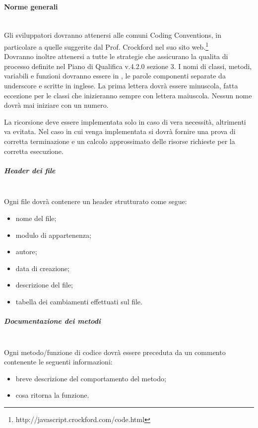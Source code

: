 \paragraph{Norme generali} \hfill \\
\label{}
Gli sviluppatori dovranno attenersi alle comuni Coding Conventions, in particolare a quelle suggerite dal Prof. Crockford nel suo sito web.\footnote{http://javascript.crockford.com/code.html}\\
Dovranno inoltre attenersi a tutte le strategie che assicurano la qualita di processo definite nel Piano di Qualifica v.4.2.0 sezione 3. 
I nomi di classi, metodi, variabili e funzioni dovranno essere in , le parole componenti separate da underscore e scritte in inglese.
La prima lettera dovrà essere minuscola, fatta eccezione per le classi che inizieranno sempre con lettera maiuscola.
Nessun nome dovrà mai iniziare con un numero.

La ricorsione deve essere implementata solo in caso di vera necessità, altrimenti va evitata. Nel caso in cui venga implementata si dovrà fornire una prova di corretta terminazione e un calcolo approssimato delle risorse richieste per la corretta esecuzione.\\


\subparagraph{Header dei file} \hfill \\

Ogni file dovrà contenere un header strutturato come segue:
\begin{itemize}
\item {} nome del file;
\item {} modulo di appartenenza;
\item {} autore;
\item {} data di creazione;
\item {} descrizione del file;
\item {} tabella dei cambiamenti effettuati sul file.
\end{itemize}

\subparagraph{Documentazione dei metodi} \hfill \\

Ogni metodo/funzione di codice dovrà essere preceduta da un commento contenente le seguenti informazioni:
\begin{itemize}
\item {} breve descrizione del comportamento del metodo;
\item {} cosa ritorna la funzione.
\end{itemize}



